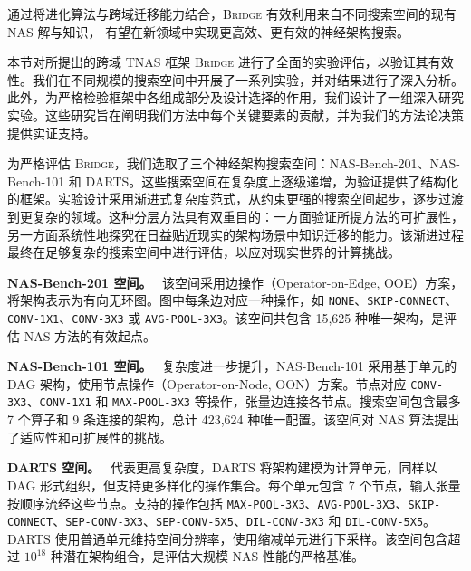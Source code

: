 \documentclass[../main.tex]{subfiles}
\begin{document}
通过将进化算法与跨域迁移能力结合，\textsc{Bridge} 有效利用来自不同搜索空间的现有 NAS 解与知识，
有望在新领域中实现更高效、更有效的神经架构搜索。

\label{sec:ch4-8-setup-and-results-analysis}

本节对所提出的跨域 TNAS 框架 \textsc{Bridge} 进行了全面的实验评估，以验证其有效性。我们在不同规模的搜索空间中开展了一系列实验，并对结果进行了深入分析。此外，为严格检验框架中各组成部分及设计选择的作用，我们设计了一组深入研究实验。这些研究旨在阐明我们方法中每个关键要素的贡献，并为我们的方法论决策提供实证支持。

\label{sec:ch4-8-1-search-space-and-datasets}

为严格评估 \textsc{Bridge}，我们选取了三个神经架构搜索空间：NAS-Bench-201、NAS-Bench-101 和 DARTS。这些搜索空间在复杂度上逐级递增，为验证提供了结构化的框架。实验设计采用渐进式复杂度范式，从约束更强的搜索空间起步，逐步过渡到更复杂的领域。这种分层方法具有双重目的：一方面验证所提方法的可扩展性，另一方面系统性地探究在日益贴近现实的架构场景中知识迁移的能力。该渐进过程最终在足够复杂的搜索空间中进行评估，以应对现实世界的计算挑战。

\textbf{NAS-Bench-201 空间。}~\cite{natsbenchbenchmarking_dong_2022}
该空间采用边操作（Operator-on-Edge, OOE）方案，将架构表示为有向无环图。图中每条边对应一种操作，如 \texttt{NONE}、\texttt{SKIP-CONNECT}、\texttt{CONV-1X1}、\texttt{CONV-3X3} 或 \texttt{AVG-POOL-3X3}。该空间共包含 15,625 种唯一架构，是评估 NAS 方法的有效起点。

\textbf{NAS-Bench-101 空间。}~\cite{nasbench101_ying_2019}
复杂度进一步提升，NAS-Bench-101 采用基于单元的 DAG 架构，使用节点操作（Operator-on-Node, OON）方案。节点对应 \texttt{CONV-3X3}、\texttt{CONV-1X1} 和 \texttt{MAX-POOL-3X3} 等操作，张量边连接各节点。搜索空间包含最多 7 个算子和 9 条连接的架构，总计 423,624 种唯一配置。该空间对 NAS 算法提出了适应性和可扩展性的挑战。

\textbf{DARTS 空间。}~\cite{dartsdifferentiablearchitecture_liu_2019}
代表更高复杂度，DARTS 将架构建模为计算单元，同样以 DAG 形式组织，但支持更多样化的操作集合。每个单元包含 7 个节点，输入张量按顺序流经这些节点。支持的操作包括 \texttt{MAX-POOL-3X3}、\texttt{AVG-POOL-3X3}、\texttt{SKIP-CONNECT}、\texttt{SEP-CONV-3X3}、\texttt{SEP-CONV-5X5}、\texttt{DIL-CONV-3X3} 和 \texttt{DIL-CONV-5X5}。DARTS 使用普通单元维持空间分辨率，使用缩减单元进行下采样。该空间包含超过 $10^{18}$ 种潜在架构组合，是评估大规模 NAS 性能的严格基准。
\end{document}
